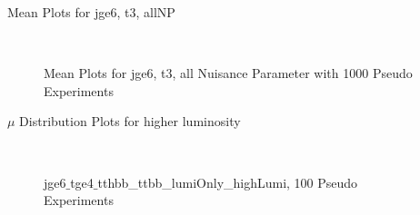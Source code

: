 \begin{frame}{Mean Plots for jge6, t3, allNP}

\begin{figure}
\centering
{} $\qquad$
\scriptsize\caption[jge6$\_$t3$\_$allNP]{Mean Plots for jge6, t3, all Nuisance Parameter with 1000 Pseudo Experiments}
\end{figure}

\end{frame}

\begin{frame}{$\mu$ Distribution Plots for higher luminosity}

\begin{figure}
\centering
{} $\qquad$
\scriptsize\caption[jge6$\_$tge4$\_$tthbb\_ttbb\_lumiOnly\_highLumi]{jge6$\_$tge4$\_$tthbb\_ttbb\_lumiOnly\_highLumi, 100 Pseudo Experiments}
\end{figure}

\end{frame}

